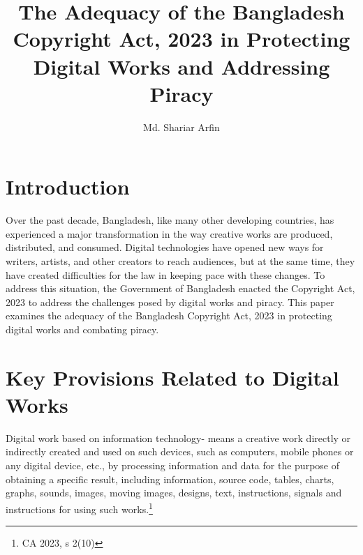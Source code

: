 \documentclass[10pt,letterpaper]{article}
\title{
  The Adequacy of the Bangladesh Copyright Act, 2023 in Protecting Digital Works and Addressing Piracy
}
\author{Md. Shariar Arfin}
\date{}
\begin{document}
\maketitle

\vspace{1em}

\section{Introduction}
Over the past decade, Bangladesh, like many other developing countries, has experienced a major transformation in the way creative works are produced, distributed, and consumed. Digital technologies have opened new ways for writers, artists, and other creators to reach audiences, but at the same time, they have created difficulties for the law in keeping pace with these changes. To address this situation, the Government of Bangladesh enacted the Copyright Act, 2023 to address the challenges posed by digital works and piracy. This paper examines the adequacy of the Bangladesh Copyright Act, 2023 in protecting digital works and combating piracy.



\section{Key Provisions Related to Digital Works}
Digital work based on information technology- means a creative work directly or indirectly created and used on such devices, such as computers, mobile phones or any digital device, etc., by processing information and data for the purpose of obtaining a specific result, including information, source code, tables, charts, graphs, sounds, images, moving images, designs, text, instructions, signals and instructions for using such works.\footnote{CA 2023, s 2(10)}
\end{document}
